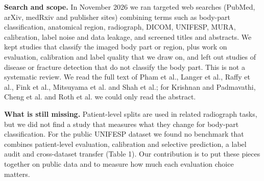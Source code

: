 \textbf{Search and scope.} In November 2026 we ran targeted web searches (PubMed, arXiv, medRxiv and publisher sites) combining terms such as body-part classification, anatomical region, radiograph, DICOM, UNIFESP, MURA, calibration, label noise and data leakage, and screened titles and abstracts. We kept studies that classify the imaged body part or region, plus work on evaluation, calibration and label quality that we draw on, and left out studies of disease or fracture detection that do not classify the body part. This is not a systematic review. We read the full text of Pham et al., Langer et al., Raffy et al., Fink et al., Mitsuyama et al. and Shah et al.; for Krishnan and Padmavathi, Cheng et al. and Roth et al. we could only read the abstract.

\textbf{What is still missing.} Patient-level splits are used in related radiograph tasks, but we did not find a study that measures what they change for body-part classification. For the public UNIFESP dataset we found no benchmark that combines patient-level evaluation, calibration and selective prediction, a label audit and cross-dataset transfer (Table 1). Our contribution is to put these pieces together on public data and to measure how much each evaluation choice matters.


